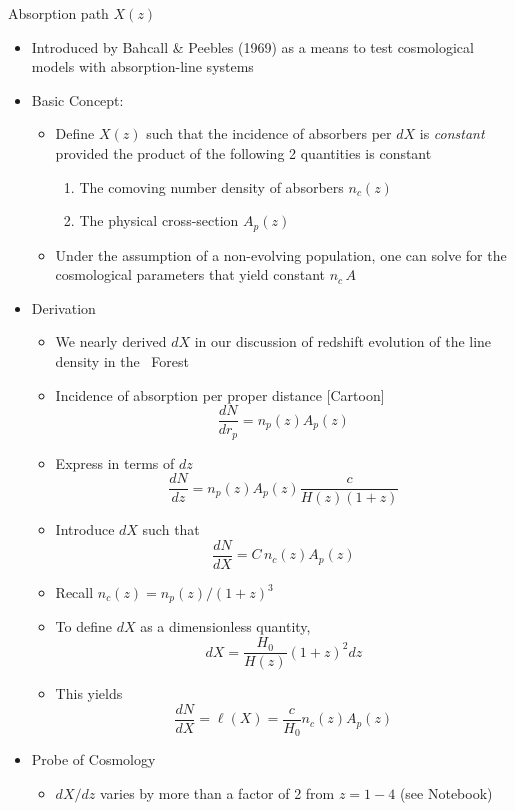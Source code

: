 \documentclass[12pt,letterpaper]{article}
\begin{document}
\begin{Aenumerate}
{\bf \item Absorption path $X(z)$}
  \begin{itemize}
  \item Introduced by Bahcall \& Peebles (1969) as a means to test 
  cosmological models with absorption-line systems
  \item Basic Concept:
  	\begin{itemize}
  	\item Define $X(z)$ such that the incidence of absorbers per $dX$
  	is {\it constant} provided the product of the following 2 quantities is
  	constant
  		\begin{enumerate}
  		\item The comoving number density of absorbers $n_c(z)$
  		\item The physical cross-section $A_p(z)$
  		\end{enumerate}
  	\item Under the assumption of a non-evolving population, one can
  	solve for the cosmological parameters that yield constant $n_c \, A$
  	\end{itemize}
  \item Derivation
  	\begin{itemize}
  	\item We nearly derived $dX$ in our discussion of redshift evolution
  	of the line density in the \lya\ Forest
  	\item Incidence of absorption per proper distance [Cartoon]
  	\begin{equation}
  	\frac{dN}{dr_p} = n_p(z) A_p(z)
  	\end{equation}
  	\item Express in terms of $dz$
  	\begin{equation}
  	\frac{dN}{dz} = n_p(z) A_p(z) \frac{c}{H(z) (1+z)}
  	\end{equation}
  	\item Introduce $dX$ such that 
  	\begin{equation}
  	\frac{dN}{dX} = C \, n_c(z) A_p(z)
  	\end{equation}
  	\item Recall $n_c(z) = n_p(z) / (1+z)^3$
  	\item To define $dX$ as a dimensionless quantity,
  	\begin{equation}
  	dX = \frac{H_0}{H(z)} (1+z)^2 dz
  	\end{equation}
  	\item This yields
  	\begin{equation}
  	\frac{dN}{dX} = \ell(X) = \frac{c}{H_0} n_c(z) A_p(z)
  	\end{equation}
  	\end{itemize}
  \item Probe of Cosmology
  	\begin{itemize}
  	\item $dX/dz$ varies by more than a factor of 2 from $z=1-4$ (see Notebook)


\end{itemize}
\end{itemize}
\end{Aenumerate}
\end{document}
